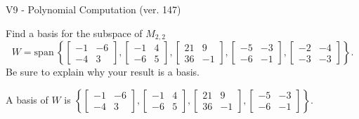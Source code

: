 \begin{exercise}
  \begin{exerciseTitle}V9 - Polynomial Computation (ver. 147)\end{exerciseTitle}
  \begin{exerciseStatement}
    Find a basis for the subspace of \(M_{2,2}\) 
\[W=\mathrm{span}\ \left\{\left[\begin{array}{cc}
-1 & -6 \\
-4 & 3
\end{array}\right] , \left[\begin{array}{cc}
-1 & 4 \\
-6 & 5
\end{array}\right] , \left[\begin{array}{cc}
21 & 9 \\
36 & -1
\end{array}\right] , \left[\begin{array}{cc}
-5 & -3 \\
-6 & -1
\end{array}\right] , \left[\begin{array}{cc}
-2 & -4 \\
-3 & -3
\end{array}\right]\right\}.\]
 Be sure to explain why your result is a basis.


  \end{exerciseStatement}
  \begin{exerciseAnswer}
   A basis of \(W\) is  \(\left\{\left[\begin{array}{cc}
-1 & -6 \\
-4 & 3
\end{array}\right] , \left[\begin{array}{cc}
-1 & 4 \\
-6 & 5
\end{array}\right] , \left[\begin{array}{cc}
21 & 9 \\
36 & -1
\end{array}\right] , \left[\begin{array}{cc}
-5 & -3 \\
-6 & -1
\end{array}\right]\right\}\).
  


  \end{exerciseAnswer}
\end{exercise}